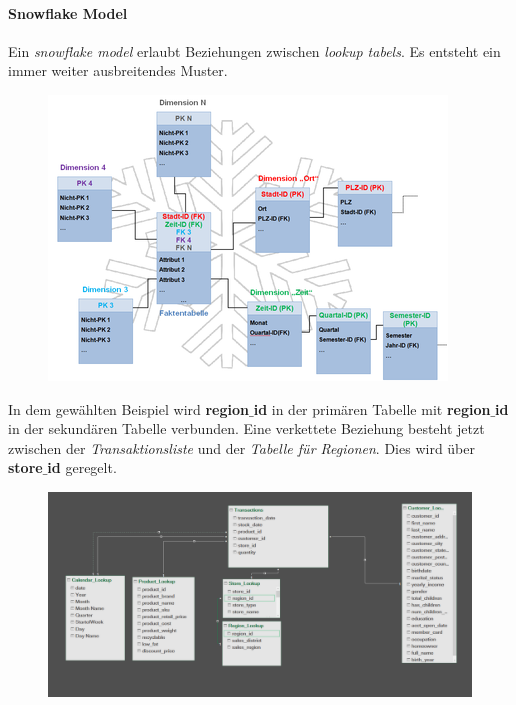 \paragraph{Snowflake Model}
Ein \textit{snowflake model} erlaubt Beziehungen zwischen \textit{lookup tabels}. Es entsteht ein immer weiter ausbreitendes Muster.
\begin{figure}[H]
	\centering
	\includegraphics[scale = 0.3]{attachment/chapter_1/screenshot060}
	\caption{}
	\label{fig:screenshot060}
\end{figure}
In dem gewählten Beispiel wird \textbf{region$\_$id} in der primären Tabelle mit \textbf{region$\_$id} in der sekundären Tabelle verbunden. Eine verkettete Beziehung besteht jetzt zwischen der \textit{Transaktionsliste} und der \textit{Tabelle für Regionen}. Dies wird über \textbf{store$\_$id} geregelt.
\begin{figure}[H]
	\centering
	\includegraphics[scale = 0.3]{attachment/chapter_1/screenshot059}
	\caption{}
	\label{fig:screenshot059}
\end{figure}
